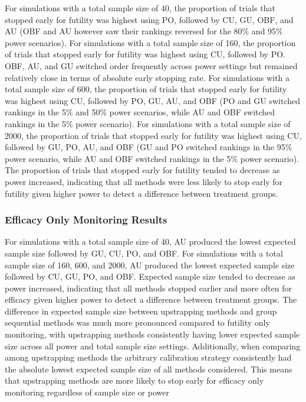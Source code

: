 \documentclass[Afour,sageh,times,square,numbers]{sagej}
\begin{document}
For simulations with a total sample size of 40, the proportion of trials that stopped early for futility was highest using PO, followed by CU, GU, OBF, and AU (OBF and AU however saw their rankings reversed for the 80\% and 95\% power scenarios).  For simulations with a total sample size of 160, the proportion of trials that stopped early for futility was highest using CU, followed by PO.  OBF, AU, and GU switched order frequently across power settings but remained relatively close in terms of absolute early stopping rate.  For simulations with a total sample size of 600, the proportion of trials that stopped early for futility was highest using CU, followed by PO, GU, AU, and OBF (PO and GU switched rankings in the 5\% and 50\% power scenarios, while AU and OBF switched rankings in the 5\% power scenario).  For simulations with a total sample size of 2000, the proportion of trials that stopped early for futility was highest using CU, followed by GU, PO, AU, and OBF (GU and PO switched rankings in the 95\% power scenario, while AU and OBF switched rankings in the 5\% power scenario).  The proportion of trials that stopped early for futility tended to decrease as power increased, indicating that all methods were less likely to stop early for futility given higher power to detect a difference between treatment groups.

\subsubsection{Efficacy Only Monitoring Results}

For simulations with a total sample size of 40, AU produced the lowest expected sample size followed by GU, CU, PO, and OBF.  For simulations with a total sample size of 160, 600, and 2000, AU produced the lowest expected sample size followed by CU, GU, PO, and OBF.  Expected sample size tended to decrease as power increased, indicating that all methods stopped earlier and more often for efficacy given higher power to detect a difference between treatment groups.  The difference in expected sample size between upstrapping methods and group sequential methods was much more pronounced compared to futility only monitoring, with upstrapping methods consistently having lower expected sample size across all power and total sample size settings.  Additionally, when comparing among upstrapping methods the arbitrary calibration strategy consistently had the absolute lowest expected sample size of all methods considered.  This means that upstrapping methods are more likely to stop early for efficacy only monitoring regardless of sample size or power  
\end{document}
